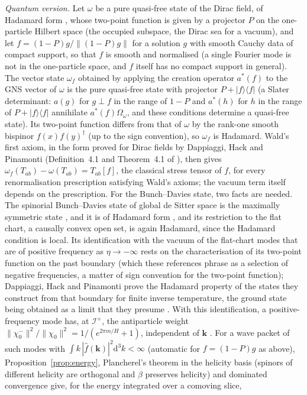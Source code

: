 \documentclass[11pt,a4paper]{article}
\theoremstyle{definition}
\newcommand{\scri}{\mathscr{I}^{+}}
\newcommand{\dd}{\mathrm{d}}
\begin{document}
\emph{Quantum version.} Let $\omega$ be a pure quasi-free state of the Dirac field, of Hadamard form \cite{Hollands2001,DHP2009}, whose two-point function is given by a projector $P$ on the one-particle Hilbert space (the occupied subspace, the Dirac sea for a vacuum), and let $f=(1-P)g/\|(1-P)g\|$ for a solution $g$ with smooth Cauchy data of compact support, so that $f$ is smooth and normalised (a single Fourier mode is not in the one-particle space, and $f$ itself has no compact support in general). The vector state $\omega_{f}$ obtained by applying the creation operator $a^{*}(f)$ to the GNS vector of $\omega$ is the pure quasi-free state with projector $P+|f\rangle\langle f|$ (a Slater determinant: $a(g)$ for $g\perp f$ in the range of $1-P$ and $a^{*}(h)$ for $h$ in the range of $P+|f\rangle\langle f|$ annihilate $a^{*}(f)\Omega_{\omega}$, and these conditions determine a quasi-free state). Its two-point function differs from that of $\omega$ by the rank-one smooth bispinor $f(x)f(y)^{\dagger}$ (up to the sign convention), so $\omega_{f}$ is Hadamard. Wald's first axiom, in the form proved for Dirac fields by Dappiaggi, Hack and Pinamonti (Definition~4.1 and Theorem~4.1 of \cite{DHP2009}), then gives $\omega_{f}(T_{ab})-\omega(T_{ab})=T_{ab}[f]$, the classical stress tensor of $f$, for every renormalisation prescription satisfying Wald's axioms; the vacuum term itself depends on the prescription. For the Bunch--Davies state, two facts are needed. The spinorial Bunch--Davies state of global de Sitter space is the maximally symmetric state \cite{AllenLutken1986}, and it is of Hadamard form \cite[Proposition~4.5]{DFMR2019}, and its restriction to the flat chart, a causally convex open set, is again Hadamard, since the Hadamard condition is local. Its identification with the vacuum of the flat-chart modes that are of positive frequency as $\eta\to-\infty$ rests on the characterisation of its two-point function on the past boundary \cite{DFMR2019,DHP2010} (which these references phrase as a selection of negative frequencies, a matter of sign convention for the two-point function); Dappiaggi, Hack and Pinamonti prove the Hadamard property of the states they construct from that boundary for finite inverse temperature, the ground state being obtained as a limit that they presume \cite{DHP2010}. With this identification, a positive-frequency mode has, at $\scri$, the antiparticle weight $\|\chi_{0}^{-}\|^{2}/\|\chi_{0}\|^{2}=1/(e^{2\pi m/H}+1)$, independent of $\mathbf{k}$ \cite{Boonpan2026}. For a wave packet of such modes with $\int k\,|\hat f(\mathbf{k})|^{2}\dd^{3}k<\infty$ (automatic for $f=(1-P)g$ as above), Proposition~\ref{prop:energy}, Plancherel's theorem in the helicity basis (spinors of different helicity are orthogonal and $\beta$ preserves helicity) and dominated convergence give, for the energy integrated over a comoving slice,
\end{document}
